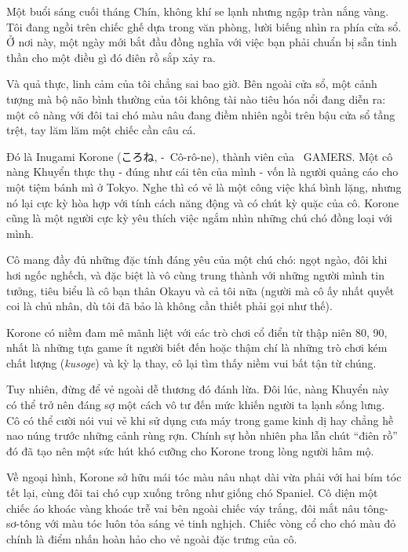 \documentclass[../main.tex]{subfiles}
\begin{document}


Một buổi sáng cuối tháng Chín, không khí se lạnh nhưng ngập tràn nắng vàng. Tôi đang ngồi trên chiếc ghế dựa trong văn phòng, lười biếng nhìn ra phía cửa sổ. Ở nơi này, một ngày mới bắt đầu đồng nghĩa với việc bạn phải chuẩn bị sẵn tinh thần cho một điều gì đó điên rồ sắp xảy ra.

Và quả thực, linh cảm của tôi chẳng sai bao giờ. Bên ngoài cửa sổ, một cảnh tượng mà bộ não bình thường của tôi không tài nào tiêu hóa nổi đang diễn ra: một cô nàng với đôi tai chó màu nâu đang điềm nhiên ngồi trên bậu cửa sổ tầng trệt, tay lăm lăm một chiếc cần câu cá.

\chrint

Đó là Inugami Korone (ころね, -\ Cô-rô-ne), thành viên của \hll\ GAMERS. Một cô nàng Khuyển thực thụ - đúng như cái tên của mình - vốn là người quảng cáo cho một tiệm bánh mì ở Tokyo. Nghe thì có vẻ là một công việc khá bình lặng, nhưng nó lại cực kỳ hòa hợp với tính cách năng động và có chút kỳ quặc của cô. Korone cũng là một người cực kỳ yêu thích việc ngắm nhìn những chú chó đồng loại với mình.

Cô mang đầy đủ những đặc tính đáng yêu của một chú chó: ngọt ngào, đôi khi hơi ngốc nghếch, và đặc biệt là vô cùng trung thành với những người mình tin tưởng, tiêu biểu là cô bạn thân Okayu và cả tôi nữa (người mà cô ấy nhất quyết coi là chủ nhân, dù tôi đã bảo là không cần thiết phải gọi như thế).

Korone có niềm đam mê mãnh liệt với các trò chơi cổ điển từ thập niên 80, 90, nhất là những tựa game ít người biết đến hoặc thậm chí là những trò chơi kém chất lượng (\textit{kusoge}) và kỳ lạ thay, cô lại tìm thấy niềm vui bất tận từ chúng.

Tuy nhiên, đừng để vẻ ngoài dễ thương đó đánh lừa. Đôi lúc, nàng Khuyển này có thể trở nên đáng sợ một cách vô tư đến mức khiến người ta lạnh sống lưng. Cô có thể cười nói vui vẻ khi sử dụng cưa máy trong game kinh dị hay chẳng hề nao núng trước những cảnh rùng rợn. Chính sự hồn nhiên pha lẫn chút ``điên rồ'' đó đã tạo nên một sức hút khó cưỡng cho Korone trong lòng người hâm mộ.

Về ngoại hình, Korone sở hữu mái tóc màu nâu nhạt dài vừa phải với hai bím tóc tết lại, cùng đôi tai chó cụp xuống trông như giống chó Spaniel. Cô diện một chiếc áo khoác vàng khoác trễ vai bên ngoài chiếc váy trắng, đôi mắt nâu tông-sơ-tông với màu tóc luôn tỏa sáng vẻ tinh nghịch. Chiếc vòng cổ cho chó màu đỏ chính là điểm nhấn hoàn hảo cho vẻ ngoài đặc trưng của cô.
\end{document}
